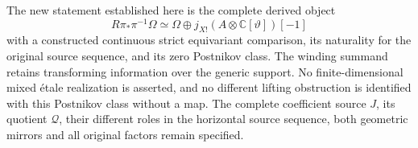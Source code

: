 The new statement established here is the complete derived object \[
R\pi_*\pi^{-1}\Omega
\simeq \Omega\oplus j_{X!}(A\otimes\mathbb C[\vartheta])[-1]
\] with a constructed continuous strict equivariant comparison, its
naturality for the original source sequence, and its zero Postnikov
class. The winding summand retains transforming information over the
generic support. No finite-dimensional mixed étale realization is
asserted, and no different lifting obstruction is identified with this
Postnikov class without a map. The complete coefficient source \(J\),
its quotient \(\mathcal Q\), their different roles in the horizontal
source sequence, both geometric mirrors and all original factors remain
specified.
